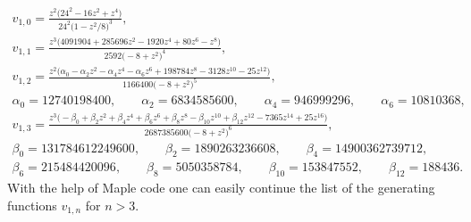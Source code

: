 \documentclass[pdftex]{sigma}
\numberwithin{equation}{section}
\begin{document}
\begin{gather}
v_{1,0}=\frac{z^2\big(24^2-16z^2+z^4\big)}{24^2\big(1-z^2/8\big)^3},\nonumber\\
v_{1,1}=\frac{z^3\big(4091904+285696z^2-1920z^4+80z^6-z^8\big)}{2592\big({-}8+z^2\big)^4},\nonumber\\
v_{1,2}=\frac{z^2\big(\alpha_0-\alpha_2z^2-\alpha_4z^4-\alpha_6z^6+198784z^8-3128z^{10}-25z^{12}\big)}{1166400\big({-}8+z^2\big)^5},\label{eq:v2-formula}\\
\alpha_0=12740198400, \qquad \alpha_2=6834585600, \qquad \alpha_4=946999296, \qquad \alpha_6=10810368,\nonumber\\
v_{1,3}=\frac{z^3\big({-}\beta_0+\beta_2z^2+\beta_4z^4+\beta_6z^6+\beta_8z^8-\beta_{10}z^{10}+\beta_{12}z^{12}-7365z^{14}+25z^{16}\big)}{2687385600\big({-}8+z^2\big)^6},\label{eq:v3-formula}\\
\beta_0=131784612249600, \qquad \beta_2=1890263236608, \qquad \beta_4=14900362739712,\nonumber\\
\beta_6=215484420096, \qquad \beta_8=5050358784, \qquad \beta_{10}=153847552, \qquad \beta_{12}=188436.\nonumber
\end{gather}
With the help of Maple code one can easily continue the list of the generating functions $v_{1,n}$ for $n>3$.
\end{document}
